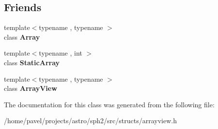\subsection*{Friends}
\begin{DoxyCompactItemize}
\item 
\hypertarget{classIterator_a23070656da6784a7e4c33c4b0ea9de35}{}\label{classIterator_a23070656da6784a7e4c33c4b0ea9de35} 
{\footnotesize template$<$typename , typename $>$ }\\class {\bfseries Array}
\item 
\hypertarget{classIterator_ae99508a72e95d5be8585a35e3ebb397d}{}\label{classIterator_ae99508a72e95d5be8585a35e3ebb397d} 
{\footnotesize template$<$typename , int $>$ }\\class {\bfseries Static\+Array}
\item 
\hypertarget{classIterator_ac2f837dd9d8eba6f6a9677dfc605fd12}{}\label{classIterator_ac2f837dd9d8eba6f6a9677dfc605fd12} 
{\footnotesize template$<$typename , typename $>$ }\\class {\bfseries Array\+View}
\end{DoxyCompactItemize}


The documentation for this class was generated from the following file\+:\begin{DoxyCompactItemize}
\item 
/home/pavel/projects/astro/sph2/src/structs/arrayview.\+h\end{DoxyCompactItemize}
